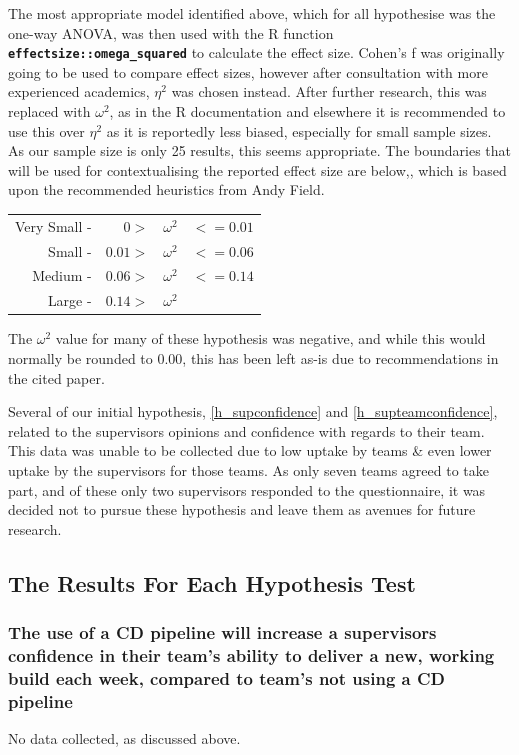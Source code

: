 \documentclass[journal]{IEEEtran}
\begin{document}
    The most appropriate model identified above, which for all hypothesise was the one-way ANOVA, was then used with the R function \textbf{\lstinline{effectsize::omega_squared}}\cite{RcohensfDocs} to calculate the effect size. Cohen's f was originally going to be used to compare effect sizes, however after consultation with more experienced academics, $\eta^2$ was chosen instead. After further research, this was replaced with $\omega^2$, as in the R documentation and elsewhere \cite{RcohensfDocs, statHowToOmegaSquared,ALBERS2018187} it is recommended to use this over $\eta^2$ as it is reportedly less biased, especially for small sample sizes\cite{ALBERS2018187}. As our sample size is only 25 results, this seems appropriate. The boundaries that will be used for contextualising the reported effect size are below,, which is based upon the recommended heuristics from Andy Field\cite{field2013discovering}.

    \begin{tabularx}{\linewidth}{r r c l}
        Very Small - & $0 > $ & $ \omega^2 $ & $<=0.01$ \\
        Small - & $0.01 > $ & $ \omega^2 $ & $<=0.06$ \\
        Medium - & $0.06 > $ & $ \omega^2 $ & $<=0.14$ \\
        Large - & $0.14 > $ & $ \omega^2 $ &  
    \end{tabularx}

    The $\omega^2$ value for many of these hypothesis was negative, and while this would normally be rounded to 0.00, this has been left as-is due to recommendations in the cited paper\cite{okada2017negative}.

    Several of our initial hypothesis, \ref{h_supconfidence} and \ref{h_supteamconfidence}, related to the supervisors opinions and confidence with regards to their team. This data was unable to be collected due to low uptake by teams \& even lower uptake by the supervisors for those teams. As only seven teams agreed to take part, and of these only two supervisors responded to the questionnaire, it was decided not to pursue these hypothesis and leave them as avenues for future research.
    \subsection*{The Results For Each Hypothesis Test}
        \subsubsection{The use of a CD pipeline will increase a supervisors confidence in their team's ability to deliver a new, working build each week, compared to team's not using a CD pipeline}
            No data collected, as discussed above. \\
\end{document}
